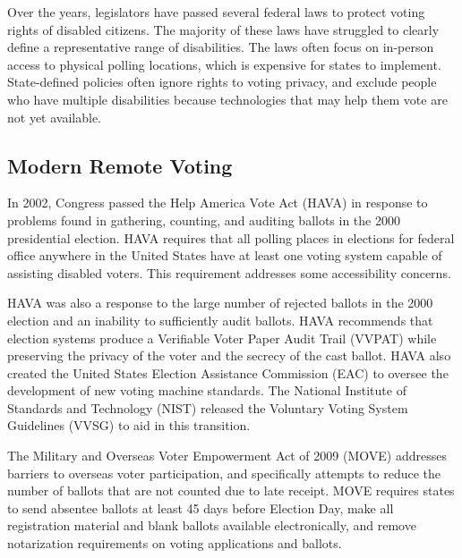 Over the years, legislators have passed several federal laws to
protect voting rights of disabled citizens. The majority of these laws
have struggled to clearly define a representative range of
disabilities. The laws often focus on in-person access to physical
polling locations, which is expensive for states to
implement. State-defined policies often ignore rights to voting
privacy, and exclude people who have multiple disabilities because
technologies that may help them vote are not yet available.



\subsection{Modern Remote Voting}

In 2002, Congress passed the Help America Vote Act (HAVA) in response
to problems found in gathering, counting, and auditing ballots in the
2000 presidential election. HAVA requires that all polling places in
elections for federal office anywhere in the United States have at
least one voting system capable of assisting disabled voters. This
requirement addresses some accessibility concerns.

HAVA was also a response to the large number of rejected ballots in
the 2000 election and an inability to sufficiently audit ballots. HAVA
recommends that election systems produce a Verifiable Voter Paper
Audit Trail (VVPAT) while preserving the privacy of the voter and the
secrecy of the cast ballot. HAVA also created the United States
Election Assistance Commission (EAC) to oversee the development of new
voting machine standards. The National Institute of Standards and
Technology (NIST) released the Voluntary Voting System Guidelines
(VVSG) to aid in this transition.

The Military and Overseas Voter Empowerment Act of 2009 (MOVE)
addresses barriers to overseas voter participation, and specifically
attempts to reduce the number of ballots that are not counted due to
late receipt. MOVE requires states to send absentee ballots at least
45 days before Election Day, make all registration material and blank
ballots available electronically, and remove notarization requirements
on voting applications and ballots.

